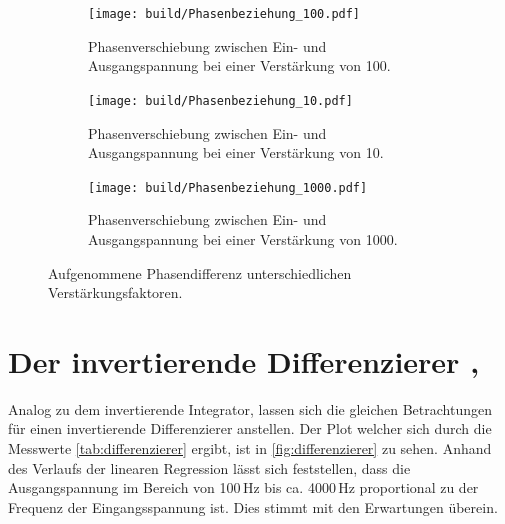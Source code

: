 \begin{figure}
    \centering
    \begin{subfigure}[b]{0.45\textwidth}
        \centering
        \texttt{[image: build/Phasenbeziehung\_100.pdf]}
        \caption{Phasenverschiebung zwischen Ein- und Ausgangspannung bei einer Verstärkung von 100.}
        \label{fig:phase_100}
    \end{subfigure}
    \hfill
    \begin{subfigure}[b]{0.45\textwidth}
        \centering
        \texttt{[image: build/Phasenbeziehung\_10.pdf]}
        \caption{Phasenverschiebung zwischen Ein- und Ausgangspannung bei einer Verstärkung von 10.}
        \label{fig:phase_10}
    \end{subfigure} 
    \newline
    \newline   
    \newline   
    \newline   
    \begin{subfigure}[b]{0.45\textwidth}
        \centering
        \texttt{[image: build/Phasenbeziehung\_1000.pdf]}
        \caption{Phasenverschiebung zwischen Ein- und Ausgangspannung bei einer Verstärkung von 1000.}
        \label{fig:phase_1000}
    \end{subfigure}
       \caption{Aufgenommene Phasendifferenz unterschiedlichen Verstärkungsfaktoren.}
       \label{fig:phase}
\end{figure}
\FloatBarrier

\section{Der invertierende Differenzierer \cite{int_data}, \cite{int_picture}}
Analog zu dem invertierende Integrator, lassen sich die gleichen Betrachtungen 
für einen invertierende Differenzierer anstellen.
Der Plot welcher sich durch die Messwerte \autoref{tab:differenzierer} ergibt, ist in
\autoref{fig:differenzierer} zu sehen.
Anhand des Verlaufs der linearen Regression lässt sich feststellen, dass die Ausgangspannung
im Bereich von 100\,Hz bis ca. 4000\,Hz proportional zu der Frequenz der Eingangsspannung ist.
Dies stimmt mit den Erwartungen überein.


